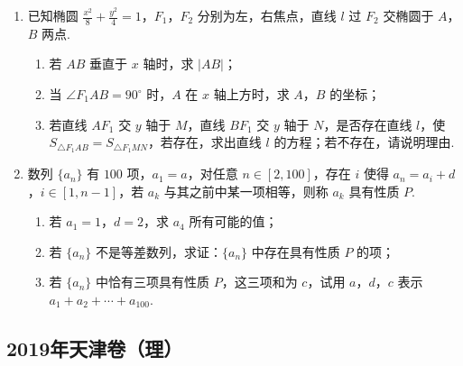 \begin{description}
\begin{enumerate}[leftmargin=5pt]
        \item 已知椭圆 \(\frac{x^2}{8}+\frac{y^2}{4}=1\)，\(F_1\)，\(F_2\) 分别为左，右焦点，直线 \(l\) 过 \(F_2\) 交椭圆于 \(A\)，\(B\) 两点.

\begin{enumerate}
\item 若 \(AB\) 垂直于 \(x\) 轴时，求 \(|AB|\)；
\item 当 \(\angle F_1AB=90^\circ\) 时，\(A\) 在 \(x\) 轴上方时，求 \(A\)，\(B\) 的坐标；
\item 若直线 \(AF_1\) 交 \(y\) 轴于 \(M\)，直线 \(BF_1\) 交 \(y\) 轴于 \(N\)，是否存在直线 \(l\)，使 \(S_{\triangle F_1AB}=S_{\triangle F_1MN}\)，若存在，求出直线 \(l\) 的方程；若不存在，请说明理由.
\end{enumerate}

        \item 数列 \(\{a_n\}\) 有 \(100\) 项，\(a_1=a\)，对任意 \(n\in[2,100]\)，存在 \(i\) 使得 \(a_n=a_i+d\)，\(i\in[1,n-1]\)，若 \(a_k\) 与其之前中某一项相等，则称 \(a_k\) 具有性质 \(P\).

\begin{enumerate}
\item 若 \(a_1=1\)，\(d=2\)，求 \(a_4\) 所有可能的值；
\item 若 \(\{a_n\}\) 不是等差数列，求证：\(\{a_n\}\) 中存在具有性质 \(P\) 的项；
\item 若 \(\{a_n\}\) 中恰有三项具有性质 \(P\)，这三项和为 \(c\)，试用 \(a\)，\(d\)，\(c\) 表示 \(a_1+a_2+\cdots+a_{100}\).
\end{enumerate}

    \end{enumerate}

\end{description}


\subsection{2019年天津卷（理）}\label{gk:2019年天津卷（理）}

